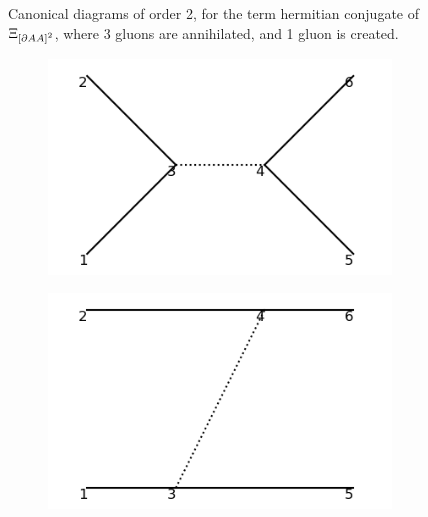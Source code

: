 \documentclass[11pt,a4paper,twoside,pdf]{article}
\numberwithin{equation}{section}
\begin{document}
\begin{figure}[h!]
\begin{subfigure}[t]{0.33\textwidth}
        \caption{ }
    \end{subfigure}
    \caption{Canonical diagrams of order 2, for the term hermitian conjugate of 
    $\Xi_{\left[ \partial AA \right]^2}$, where 3 gluons are annihilated, and
    1 gluon is created.}
    \label{fig:cannonical2_3to1}
\end{figure}

\begin{figure}[h!]
    \centering
    \begin{subfigure}[t]{0.24\textwidth}
        \centering
        \includegraphics[width=\textwidth]{plots/canonical/order2/4.png}
        \caption{ }
    \end{subfigure}%
    \begin{subfigure}[t]{0.24\textwidth}
        \centering
        \includegraphics[width=\textwidth]{plots/canonical/order2/5.png}
        \caption{ }
    \end{subfigure}
    \begin{subfigure}[t]{0.24\textwidth}

\end{subfigure}
\end{figure}
\end{document}

